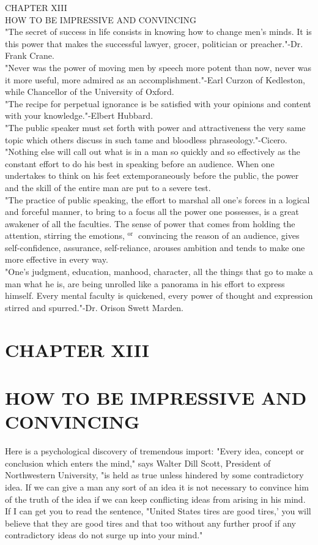 \documentclass[10pt]{article}
\begin{document}
CHAPTER XIII\\
HOW TO BE IMPRESSIVE AND CONVINCING\\
"The secret of success in life consists in knowing how to change men's minds. It is this power that makes the successful lawyer, grocer, politician or preacher."-Dr. Frank Crane.\\
"Never was the power of moving men by speech more potent than now, never was it more useful, more admired as an accomplishment."-Earl Curzon of Kedleston, while Chancellor of the University of Oxford.\\
"The recipe for perpetual ignorance is be satisfied with your opinions and content with your knowledge."-Elbert Hubbard.\\
"The public speaker must set forth with power and attractiveness the very same topic which others discuss in such tame and bloodless phraseology."-Cicero.\\
"Nothing else will call out what is in a man so quickly and so effectively as the constant effort to do his best in speaking before an audience. When one undertakes to think on his feet extemporaneously before the public, the power and the skill of the entire man are put to a severe test.\\
"The practice of public speaking, the effort to marshal all one's forces in a logical and forceful manner, to bring to a focus all the power one possesses, is a great awakener of all the faculties. The sense of power that comes from holding the attention, stirring the emotions, ${ }^{\text {or }}$ convincing the reason of an audience, gives self-confidence, assurance, self-reliance, arouses ambition and tends to make one more effective in every way.\\
"One's judgment, education, manhood, character, all the things that go to make a man what he is, are being unrolled like a panorama in his effort to express himself. Every mental faculty is quickened, every power of thought and expression stirred and spurred."-Dr. Orison Swett Marden.

\section*{CHAPTER XIII}
\section*{HOW TO BE IMPRESSIVE AND CONVINCING}
Here is a psychological discovery of tremendous import: "Every idea, concept or conclusion which enters the mind," says Walter Dill Scott, President of Northwestern University, "is held as true unless hindered by some contradictory idea. If we can give a man any sort of an idea it is not necessary to convince him of the truth of the idea if we can keep conflicting ideas from arising in his mind. If I can get you to read the sentence, "United States tires are good tires,' you will believe that they are good tires and that too without any further proof if any contradictory ideas do not surge up into your mind."
\end{document}
